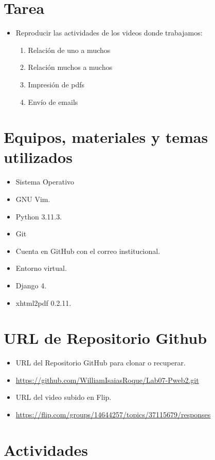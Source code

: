 \documentclass{article}
\begin{document}
	\section{Tarea}
	\begin{itemize}
         \item Reproducir las actividades de los videos donde trabajamos:
         \begin{enumerate}
         \item Relación de uno a muchos
         \item Relación muchos a muchos
         \item Impresión de pdfs
         \item Envío de emails
         \end{enumerate}
         \end{itemize}
		
	\section{Equipos, materiales y temas utilizados}
	\begin{itemize}
		\item Sistema Operativo 
		\item GNU Vim.
		\item Python 3.11.3.
		\item Git
		\item Cuenta en GitHub con el correo institucional.
		\item Entorno virtual.
            \item Django 4.
            \item xhtml2pdf 0.2.11.
	\end{itemize}
	
	\section{URL de Repositorio Github}
	\begin{itemize}
		\item URL del Repositorio GitHub para clonar o recuperar.
		\item \url{https://github.com/WilliamIsaiasRoque/Lab07-Pweb2.git}
            \item URL del video subido en Flip.
            \item \url{https://flip.com/groups/14644257/topics/37115679/responses}
	\end{itemize}
	
	\section{Actividades}
\end{document}
